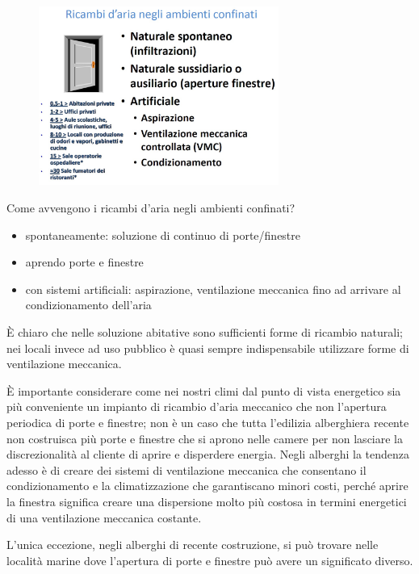 \begin{figure}[!ht]
\centering
	\includegraphics[width=0.7\textwidth]{23/image9.jpg}
	\end{figure}

Come avvengono i ricambi d'aria negli ambienti confinati?

\begin{itemize}
\item
  spontaneamente: soluzione di continuo di porte/finestre
\item
  aprendo porte e finestre
\item
  con sistemi artificiali: aspirazione, ventilazione meccanica fino ad
  arrivare al condizionamento dell'aria
\end{itemize}

È chiaro che nelle soluzione abitative sono sufficienti forme di
ricambio naturali; nei locali invece ad uso pubblico è quasi sempre
indispensabile utilizzare forme di ventilazione meccanica.

È importante considerare come nei nostri climi dal punto di vista
energetico sia più conveniente un impianto di ricambio d'aria meccanico
che non l'apertura periodica di porte e finestre; non è un caso che
tutta l'edilizia alberghiera recente non costruisca più porte e finestre
che si aprono nelle camere per non lasciare la discrezionalità al
cliente di aprire e disperdere energia. Negli alberghi la tendenza
adesso è di creare dei sistemi di ventilazione meccanica che consentano
il condizionamento e la climatizzazione che garantiscano minori costi,
perché aprire la finestra significa creare una dispersione molto più
costosa in termini energetici di una ventilazione meccanica costante.

L'unica eccezione, negli alberghi di recente costruzione, si può trovare
nelle località marine dove l'apertura di porte e finestre può avere un
significato diverso.

